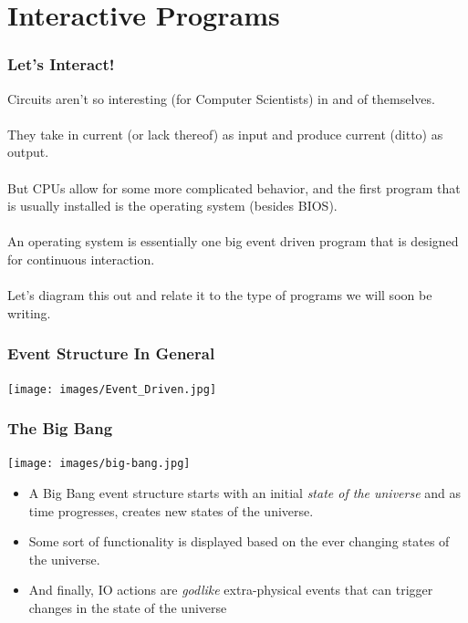 \documentclass{beamer}
\begin{document}
\section{Interactive Programs}
\begin{frame}
  \frametitle{Let's Interact!}
  Circuits aren't so interesting (for Computer Scientists) in and of themselves.
  \\\\
  \pause
  They take in current (or lack thereof) as input and produce current (ditto) as output.
  \\\\
  \pause
  But CPUs allow for some more complicated behavior, and the first program  that is usually installed is the operating system (besides BIOS).
  \\\\
  \pause
  An operating system is essentially one big event driven program that is
  designed for continuous interaction.
  \\\\
  \pause
  Let's diagram this out and relate it to the type of programs we will soon
  be writing.
\end{frame}

\begin{frame}
  \frametitle{Event Structure In General}
  \begin{center}
    \texttt{[image: images/Event\_Driven.jpg]}
  \end{center}
\end{frame}

\begin{frame}
  \frametitle{The Big Bang}
  \begin{center}
    \texttt{[image: images/big-bang.jpg]}
  \end{center}
  \begin{itemize}
  \item<2->A Big Bang event structure starts with an initial \emph{state of the universe}
  and as time progresses, creates new states of the universe.
  
  \item<3-> Some sort of functionality is displayed based on the ever changing states of the
  universe.
  
\item<4-> And finally, IO actions are \emph{godlike} extra-physical events that can trigger  changes in the state of the universe
  \end{itemize}
\end{frame}
\end{document}
